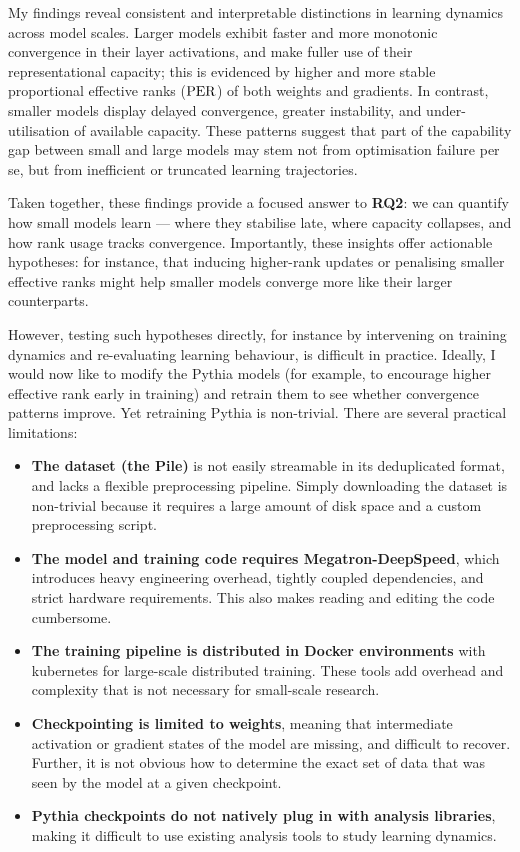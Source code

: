My findings reveal consistent and interpretable distinctions in learning dynamics across model scales. Larger models exhibit faster and more monotonic convergence in their layer activations, and make fuller use of their representational capacity; this is evidenced by higher and more stable proportional effective ranks ($\mathrm{PER}$) of both weights and gradients. In contrast, smaller models display delayed convergence, greater instability, and under-utilisation of available capacity. These patterns suggest that part of the capability gap between small and large models may stem not from optimisation failure per se, but from inefficient or truncated learning trajectories. 

Taken together, these findings provide a focused answer to \textbf{RQ2}: we can quantify how small models learn --- where they stabilise late, where capacity collapses, and how rank usage tracks convergence. Importantly, these insights offer actionable hypotheses: for instance, that inducing higher-rank updates or penalising smaller effective ranks might help smaller models converge more like their larger counterparts. 

However, testing such hypotheses directly, for instance by intervening on training dynamics and re-evaluating learning behaviour, is difficult in practice. Ideally, I would now like to modify the Pythia models (for example, to encourage higher effective rank early in training) and retrain them to see whether convergence patterns improve. Yet retraining Pythia is non-trivial. There are several practical limitations:

\begin{itemize}[label=\xmark]
    \item \textbf{The dataset (the Pile)} is not easily streamable in its deduplicated format, and lacks a flexible preprocessing pipeline. Simply downloading the dataset is non-trivial because it requires a large amount of disk space and a custom preprocessing script.
    \item \textbf{The model and training code requires Megatron-DeepSpeed}, which introduces heavy engineering overhead, tightly coupled dependencies, and strict hardware requirements. This also makes reading and editing the code cumbersome.
    \item \textbf{The training pipeline is distributed in Docker environments} with kubernetes for large-scale distributed training. These tools add overhead and complexity that is not necessary for small-scale research.
    \item \textbf{Checkpointing is limited to weights}, meaning that intermediate activation or gradient states of the model are missing, and difficult to recover. Further, it is not obvious how to determine the exact set of data that was seen by the model at a given checkpoint. 
    \item \textbf{Pythia checkpoints do not natively plug in with analysis libraries}, making it difficult to use existing analysis tools to study learning dynamics.
\end{itemize}

